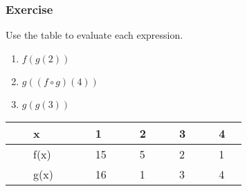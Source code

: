 \documentclass[12pt]{beamer}
\begin{document}
\begin{frame}
	\frametitle{Exercise}
	\vspace*{\fill}
	\vspace*{\fill}
	\initclock
	\vspace*{\fill}
	Use the table to evaluate each expression.
	\begin{multicols}{3}
		\begin{enumerate}
			\item $f(g(2))$
			\item $g((f\circ g)(4))$
			\item $g(g(3))$
		\end{enumerate}
	\end{multicols}
	\vspace*{\fill}
	\begin{center}
		\begin{table}[]
			\begin{tabular}{|l|l|l|l|l|}
				\hline
				$\quad$$\quad$x$\quad$$\quad$$\quad$ & $\quad$1$\quad$  & $\quad$2$\quad$ & $\quad$3$\quad$ & $\quad$4$\quad$ \\ \hline
				$\quad$$\quad$f(x)                   & $\quad$15$\quad$ & $\quad$5$\quad$ & $\quad$2$\quad$ & $\quad$1$\quad$ \\ \hline
				$\quad$$\quad$g(x)                   & $\quad$16$\quad$ & $\quad$1$\quad$ & $\quad$3$\quad$ & $\quad$4$\quad$ \\ \hline
			\end{tabular}
		\end{table}
	\end{center}
	\vspace*{\fill}
	\vspace*{\fill}
	\crono
\end{frame}
\end{document}
